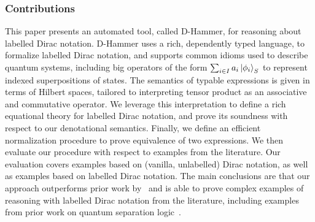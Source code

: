 \subsubsection*{Contributions}
This paper presents an automated tool, called D-Hammer, for reasoning
about labelled Dirac notation. D-Hammer uses a rich, dependently typed
language, to formalize labelled Dirac notation, and supports common
idioms used to describe quantum systems, including big operators of
the form $\sum_{i\in I} a_i \ket{\phi_i}_S$ to represent indexed
superpositions of states. The semantics of typable expressions is
given in terms of Hilbert spaces, tailored to interpreting tensor
product as an associative and commutative operator. We leverage this
interpretation to define a rich equational theory for labelled Dirac
notation, and prove its soundness with respect to our denotational
semantics. Finally, we define an efficient normalization procedure to
prove equivalence of two expressions. We then evaluate our procedure
with respect to examples from the literature. Our evaluation covers
examples based on (vanilla, unlabelled) Dirac notation, as well as
examples based on labelled Dirac notation. The main conclusions are
that our approach outperforms prior work by~\cite{diracdec} and is
able to prove complex examples of reasoning with labelled Dirac
notation from the literature, including examples from prior work on
quantum separation logic~\cite{DBLP:conf/lics/ZhouBHYY21}.





